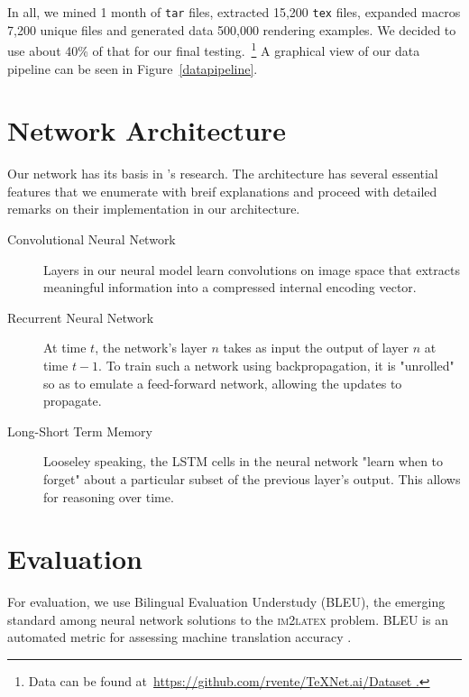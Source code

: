\documentclass{article}
\begin{document}
In all, we mined 1 month of \texttt{tar} files, extracted 15,200 \texttt{tex}
files, expanded macros 7,200 unique files and generated data 500,000 rendering
examples. We decided to use about 40\% of that for our final
testing.~\footnote{Data can be found
at~\url{https://github.com/rvente/TeXNet.ai/Dataset .}} A graphical view of our
data pipeline can be seen in Figure~\ref{datapipeline}.

\section{Network Architecture}

Our network has its basis in \citeauthor{singh2018teaching}'s research. The
architecture has several essential features that we enumerate with breif
explanations and proceed with detailed remarks on their implementation in our
architecture.

\begin{description}
  \item[Convolutional Neural Network] Layers in our neural model learn
  convolutions on image space that extracts meaningful information into a
  compressed internal encoding vector.
  \item[Recurrent Neural Network] At time $t$, the network's layer $n$ takes as
  input the output of layer $n$ at time $t-1$. To train such a network using
  backpropagation, it is "unrolled" so as to emulate a feed-forward network,
  allowing the updates to propagate.
  \item[Long-Short Term Memory] Looseley speaking, the LSTM cells in the neural
  network "learn when to forget" about a particular subset of the previous
  layer's output. This allows for reasoning over time.
\end{description}

\section{Evaluation}

For evaluation, we use Bilingual Evaluation Understudy (BLEU), the emerging
standard among neural network solutions to the \textsc{im2latex} problem. BLEU
is an automated metric for assessing machine translation accuracy
\cite[1]{papineni2002bleu}. 

\printbibliography{}
\end{document}
